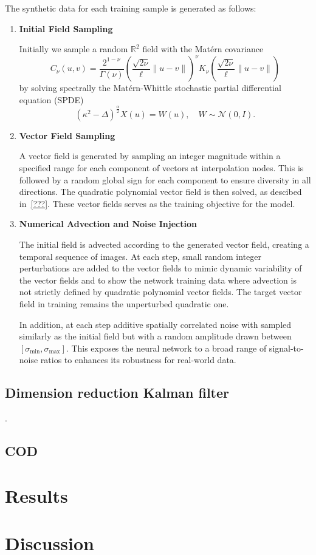\documentclass[a4paper,12pt]{article}
\begin{document}
The synthetic data for each training sample is generated as follows:
\begin{enumerate}
    \item 
        \textbf{Initial Field Sampling}

        Initially we sample a random $\mathbb{R}^2$ field with the Matérn covariance
        \begin{equation}
            C_{\nu}(u,v) = \frac{2^{1-\nu}}{\Gamma(\nu)} (\frac{\sqrt{2\nu}}{\ell} \lVert u - v \rVert)^{\nu} K_{\nu}(\frac{\sqrt{2\nu}}{\ell} \lVert u - v \rVert)
        \end{equation}
        by solving spectrally the Matérn-Whittle stochastic partial differential equation (SPDE)~\cite{whittle63, lindgren}
        \begin{equation}
            (\kappa^2 - \Delta)^{\frac{\alpha}{2}} X(u) = W(u), \quad W \sim \mathcal{N}(0, I).
        \end{equation}

    \item 
        \textbf{Vector Field Sampling}

        A vector field is generated by sampling an integer magnitude within a specified range for each component of vectors at interpolation nodes.
        This is followed by a random global sign for each component to ensure diversity in all directions.
        The quadratic polynomial vector field is then solved, as descibed in~\ref{???}.
        These vector fields serves as the training objective for the model.

    \item
        \textbf{Numerical Advection and Noise Injection}

        The initial field is advected according to the generated vector field, creating a temporal sequence of images.
        At each step, small random integer perturbations are added to the vector fields to mimic dynamic variability of the vector fields and to show the network training data where advection is not strictly defined by quadratic polynomial vector fields.
        The target vector field in training remains the unperturbed quadratic one.

        In addition, at each step additive spatially correlated noise with sampled similarly as the initial field but with a random amplitude drawn between $[\sigma_{\text{min}}, \sigma_{\text{max}}]$.
        This exposes the neural network to a broad range of signal-to-noise ratios to enhances its robustness for real-world data.
\end{enumerate}
\subsection{Dimension reduction Kalman filter}
\cite{solonen}.

\subsection{COD}
\section{Results}


\section{Discussion}



\cite{de2019deep}



\end{document}
